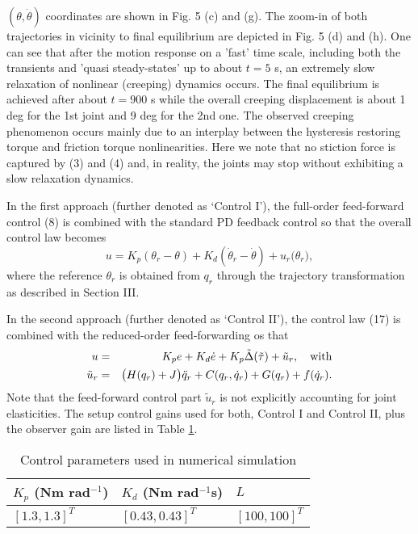 \documentclass[a4paper, 10pt, conference]{ieeeconf}
\begin{document}
$(\theta , \dot{\theta})$ coordinates are shown in Fig. 5 (c) and
(g). The zoom-in of both trajectories in vicinity to final
equilibrium are depicted in Fig. 5 (d) and (h). One can see that
after the motion response on a 'fast' time scale, including both
the transients and 'quasi steady-states' up to about $t = 5$ s, an
extremely slow relaxation of nonlinear (creeping) dynamics occurs.
The final equilibrium is achieved after about $t = 900$ s while
the overall creeping displacement is about 1 deg for the 1st joint
and 9 deg for the 2nd one. The observed creeping phenomenon occurs
mainly due to an interplay between the hysteresis restoring torque
and friction torque nonlinearities. Here we note that no stiction
force is captured by (3) and (4) and, in reality, the joints may
stop without exhibiting a slow relaxation dynamics.


In the first approach (further denoted as `Control I'), the
full-order feed-forward control (8) is combined with the standard
PD feedback control so that the overall control law becomes
\begin{equation}\label{10}
u = K_{p}(\theta_r-\theta) + K_{d}(\dot{\theta}_r-\dot{\theta}) +
u_r\bigl(\theta_r\bigr),
\end{equation}
where the reference $\theta_r$ is obtained from $q_r$ through the
trajectory transformation as described in Section III.

In the second approach (further denoted as `Control II'), the
control law (17) is combined with the reduced-order
feed-forwarding os that
\begin{eqnarray}
\label{11}
u &=& K_p e + K_d \dot{e} + K_p \tilde{\Delta}(\tilde{\tau}) + \tilde{u}_r, \quad \hbox{with} \\
\nonumber  \tilde{u}_r &=& \bigl(H(q_r) + J\bigr)\ddot{q}_r
+C(q_r, \dot{q}_r) +G(q_r) + f(\dot{q}_{r}).
\end{eqnarray}
Note that the feed-forward control part $\tilde{u}_r$ is not
explicitly accounting for joint elasticities. The setup control
gains used for both, Control I and Control II, plus the observer
gain are listed in Table \ref{tab:simcontrol}.
\begin{table}[!h]
  \renewcommand{\arraystretch}{1.5}
  \caption{Control parameters used in numerical simulation}
  \label{tab:simcontrol}
  \begin{center}
  \begin{tabular} {|p{2cm}|p{2cm}|p{2cm}|}
  \hline
  $K_p$ (Nm rad$^{-1}$)        & $K_d$  (Nm rad$^{-1}$s)               & $L$   \\[0.05cm]
  \hline \hline
  $[1.3,1.3]^T$     & $[0.43,0.43]^T$      & $[100,100]^T$\\
  \hline
  \end{tabular}
  \end{center}
  \normalsize
\end{table}
\end{document}
